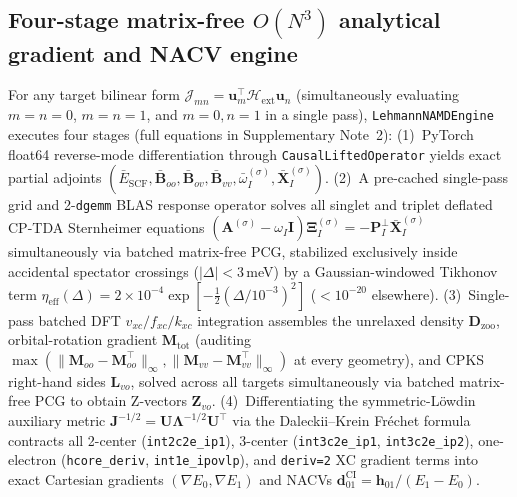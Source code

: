 \documentclass[10pt,twocolumn]{article}
\theoremstyle{natthm}
\newcommand{\Hext}{\mathcal{H}_{\mathrm{ext}}}
\newcommand{\dCI}{\mathbf{d}_{01}^{\mathrm{CI}}}
\newcommand{\hCI}{\mathbf{h}_{01}}
\begin{document}
\subsection*{Four-stage matrix-free $O(N^3)$ analytical gradient and NACV engine}
For any target bilinear form $\mathcal{J}_{mn}=\mathbf{u}_m^\top\Hext\mathbf{u}_n$ (simultaneously evaluating $m=n=0$, $m=n=1$, and $m=0,n=1$ in a single pass), \texttt{LehmannNAMDEngine} executes four stages (full equations in Supplementary Note~2):
(1)~PyTorch float64 reverse-mode differentiation through \texttt{CausalLiftedOperator} yields exact partial adjoints $(\bar{E}_{\mathrm{SCF}},\bar{\mathbf{B}}_{oo},\bar{\mathbf{B}}_{ov},\bar{\mathbf{B}}_{vv},\bar{\omega}_I^{(\sigma)},\bar{\mathbf{X}}_I^{(\sigma)})$.
(2)~A pre-cached single-pass grid and 2-\texttt{dgemm} BLAS response operator solves all singlet and triplet deflated CP-TDA Sternheimer equations $(\mathbf{A}^{(\sigma)}-\omega_I\mathbf{I})\boldsymbol{\Xi}_I^{(\sigma)}=-\mathbf{P}_I^\perp\bar{\mathbf{X}}_I^{(\sigma)}$ simultaneously via batched matrix-free PCG, stabilized exclusively inside accidental spectator crossings ($|\Delta|<3$\,meV) by a Gaussian-windowed Tikhonov term $\eta_{\mathrm{eff}}(\Delta)=2\times 10^{-4}\exp[-\tfrac{1}{2}(\Delta/10^{-3})^2]$ ($<10^{-20}$ elsewhere).
(3)~Single-pass batched DFT $v_{xc}/f_{xc}/k_{xc}$ integration assembles the unrelaxed density $\mathbf{D}_{\mathrm{zoo}}$, orbital-rotation gradient $\mathbf{M}_{\mathrm{tot}}$ (auditing $\max(\|\mathbf{M}_{oo}-\mathbf{M}_{oo}^\top\|_\infty,\|\mathbf{M}_{vv}-\mathbf{M}_{vv}^\top\|_\infty)$ at every geometry), and CPKS right-hand sides $\mathbf{L}_{vo}$, solved across all targets simultaneously via batched matrix-free PCG to obtain Z-vectors $\mathbf{Z}_{vo}$.
(4)~Differentiating the symmetric-L\"owdin auxiliary metric $\mathbf{J}^{-1/2}=\mathbf{U}\mathbf{\Lambda}^{-1/2}\mathbf{U}^\top$ via the Daleckii--Krein Fr\'echet formula\cite{daleckii1956} contracts all 2-center (\texttt{int2c2e\_ip1}), 3-center (\texttt{int3c2e\_ip1}, \texttt{int3c2e\_ip2}), one-electron (\texttt{hcore\_deriv}, \texttt{int1e\_ipovlp}), and \texttt{deriv=2} XC gradient terms into exact Cartesian gradients $(\nabla E_0,\nabla E_1)$ and NACVs $\dCI=\hCI/(E_1-E_0)$.
\end{document}
